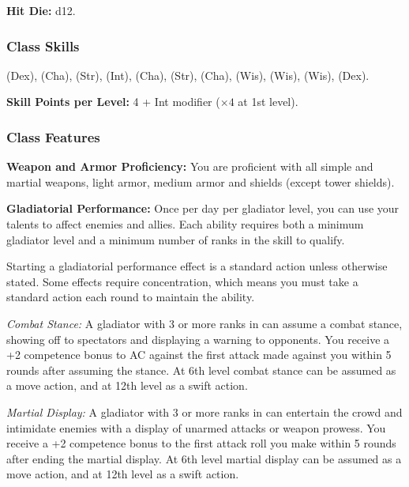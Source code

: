 \textbf{Hit Die:} d12.

\subsubsection{Class Skills}
 (Dex),  (Cha),  (Str),  (Int),  (Cha),  (Str),  (Cha),  (Wis),  (Wis),  (Wis),  (Dex).

\textbf{Skill Points per Level:} 4 + Int modifier ($\times4$ at 1st level).

\subsubsection{Class Features}

\textbf{Weapon and Armor Proficiency:} You are proficient with all simple and martial weapons, light armor, medium armor and shields (except tower shields).

\textbf{Gladiatorial Performance:} Once per day per gladiator level, you can use your talents to affect enemies and allies. Each ability requires both a minimum gladiator level and a minimum number of ranks in the  skill to qualify.

Starting a gladiatorial performance effect is a standard action unless otherwise stated. Some effects require concentration, which means you must take a standard action each round to maintain the ability.

\textit{Combat Stance:} A gladiator with 3 or more ranks in  can assume a combat stance, showing off to spectators and displaying a warning to opponents. You receive a +2 competence bonus to AC against the first attack made against you within 5 rounds after assuming the stance. At 6th level combat stance can be assumed as a move action, and at 12th level as a swift action.

\textit{Martial Display:} A gladiator with 3 or more ranks in  can entertain the crowd and intimidate enemies with a display of unarmed attacks or weapon prowess. You receive a +2 competence bonus to the first attack roll you make within 5 rounds after ending the martial display. At 6th level martial display can be assumed as a move action, and at 12th level as a swift action.

